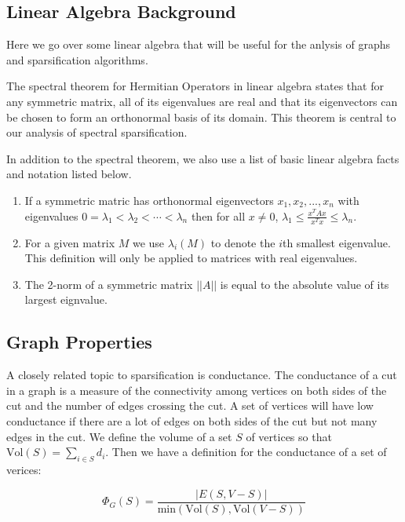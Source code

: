 \documentclass[12pt,twoside]{article}
\begin{document}
\subsection{Linear Algebra Background} 

Here we go over some linear algebra that will be useful for the anlysis of graphs and sparsification algorithms.

The spectral theorem for Hermitian Operators in linear algebra states that for any symmetric matrix, all of its eigenvalues are real and that its eigenvectors can be chosen to form an orthonormal basis of its domain. This theorem is central to our analysis of spectral sparsification.

In addition to the spectral theorem, we also use a list of basic linear algebra facts and notation listed below.

\begin{enumerate}
    \item If a symmetric matric has orthonormal eigenvectors $x_1, x_2, ... , x_n$ with eigenvalues $0 = \lambda_1 < \lambda_2 < \cdots  < \lambda_n$ then for all $x \neq 0$, $\lambda_1 \leq \frac{x^TAx}{x^Tx} \leq \lambda_n$.
    \item For a given matrix $M$ we use $\lambda_i(M)$ to denote the $i$th smallest eigenvalue. This definition will only be applied to matrices with real eigenvalues.
    \item The 2-norm of a symmetric matrix $||A||$ is equal to the absolute value of its largest eignvalue.
\end{enumerate}


\subsection{Graph Properties}

A closely related topic to sparsification is conductance. The conductance of a cut in a graph is a measure of the connectivity among vertices on both sides of the cut and the number of edges crossing the cut. A set of vertices will have low conductance if there are a lot of edges on both sides of the cut but not many edges in the cut. We define the volume of a set $S$ of vertices so that $\text{Vol}(S)=\sum_{i\in S} d_i$. Then we have a definition for the conductance of a set of verices:

\begin{equation}
\label{eqn:conductance-def}
\Phi_G(S) = \frac{|E(S,V-S)|}{\text{min}(\text{Vol}(S),\text{Vol}(V-S))}
\end{equation}
\end{document}
